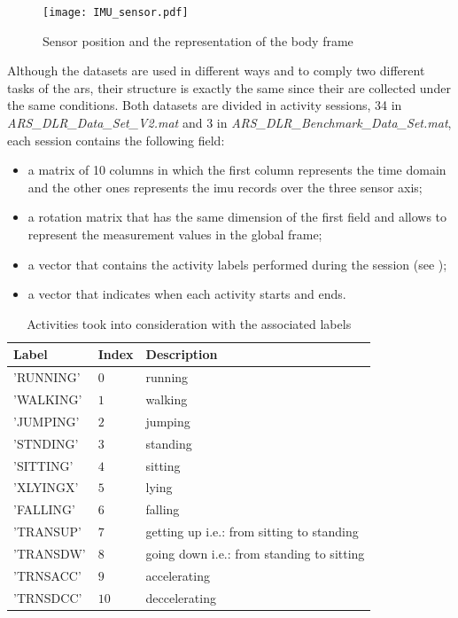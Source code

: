 \begin{figure}[htp]
\texttt{[image: IMU\_sensor.pdf]}
\caption{Sensor position and the representation of the body frame}
\label{fig:IMU}
\end{figure}

Although the datasets are used in different ways and to comply two different tasks of the \gls{ars}, their structure is exactly the same since their are collected under the same conditions.
Both datasets are divided in activity sessions, 34 in \textit{ARS\_DLR\_Data\_Set\_V2.mat} and 3 in \textit{ARS\_DLR\_Benchmark\_Data\_Set.mat}, each session contains the following field:
\begin{itemize}
\item a matrix of 10 columns in which the first column represents the time domain and the other ones represents the \gls{imu} records over the three sensor axis;
\item a rotation matrix that has the same dimension of the first field and allows to represent the measurement values in the global frame;
\item a vector that contains the activity labels performed during the session (see );
\item a vector that indicates when each activity starts and ends.
\end{itemize}

\begin{table}[htp]
\small
	\centering
		\renewcommand{\arraystretch}{1}%
	\begin{tabular}{@{}lll@{}}
	\toprule
	Label & Index & Description\\ \midrule
	'RUNNING' & $0$ & running \\
	'WALKING' & $1$ & walking \\
	'JUMPING' & $2$ & jumping  \\
	'STNDING' & $3$ & standing \\
	'SITTING' & $4$ & sitting\\
	'XLYINGX' & $5$ & lying \\
	'FALLING' & $6$ & falling \\
	'TRANSUP' & $7$ & getting up i.e.: from sitting to standing \\
	'TRANSDW' & $8$ & going down i.e.: from standing to sitting\\
	'TRNSACC' & $9$ & accelerating\\
	'TRNSDCC' & $10$ & deccelerating\\
	\bottomrule
	\end{tabular}
	\caption{Activities took into consideration with the associated labels}
	\label{tab:label}
\end{table}


